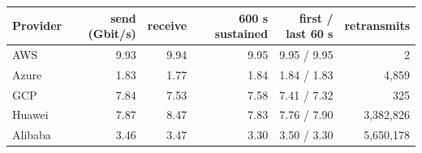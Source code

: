 \begin{tabular}{lrrrrr}
\toprule
Provider & send (Gbit/s) & receive & 600 s sustained & first / last 60 s & retransmits \\
\midrule
AWS & 9.93 & 9.94 & 9.95 & 9.95 / 9.95 & 2 \\
Azure & 1.83 & 1.77 & 1.84 & 1.84 / 1.83 & 4{,}859 \\
GCP & 7.84 & 7.53 & 7.58 & 7.41 / 7.32 & 325 \\
Huawei & 7.87 & 8.47 & 7.83 & 7.76 / 7.90 & 3{,}382{,}826 \\
Alibaba & 3.46 & 3.47 & 3.30 & 3.50 / 3.30 & 5{,}650{,}178 \\
\bottomrule
\end{tabular}
